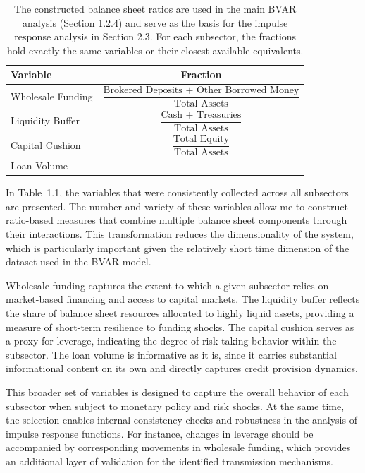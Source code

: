 \documentclass[12pt,a4paper]{report}
\begin{document}
\begin{table}[H]
\centering
\renewcommand{\arraystretch}{2.0}   %
\begin{tabular}{l|c}
\hline
\textbf{Variable} & \textbf{Fraction} \\
\hline
Wholesale Funding & $\dfrac{\text{Brokered Deposits + Other Borrowed Money}}{\text{Total Assets}}$ \\
Liquidity Buffer  & $\dfrac{\text{Cash + Treasuries}}{\text{Total Assets}}$ \\
Capital Cushion   & $\dfrac{\text{Total Equity}}{\text{Total Assets}}$ \\
Loan Volume       & -- \\
\hline
\end{tabular}
\caption{The constructed balance sheet ratios are used in the main BVAR analysis (Section 1.2.4) and serve as the basis for the impulse response analysis in Section 2.3. For each subsector, the fractions hold exactly the same variables or their closest available equivalents.}
\label{tab:balance_sheet_ratios}
\end{table}

In Table~1.1, the variables that were consistently collected across all subsectors are presented.
The number and variety of these variables allow me to construct ratio-based measures that combine
multiple balance sheet components through their interactions. This transformation reduces the
dimensionality of the system, which is particularly important given the relatively short time
dimension of the dataset used in the BVAR model.

Wholesale funding captures the extent to which a given subsector relies on market-based financing
and access to capital markets. The liquidity buffer reflects the share of balance sheet resources
allocated to highly liquid assets, providing a measure of short-term resilience to funding shocks.
The capital cushion serves as a proxy for leverage, indicating the degree of risk-taking behavior
within the subsector. The loan volume is informative as it is, since it carries substantial informational content on its own and directly captures credit provision dynamics. 

This broader set of variables is designed to capture the overall behavior of each subsector when
subject to monetary policy and risk shocks. At the same time, the selection enables internal
consistency checks and robustness in the analysis of impulse response functions. For instance,
changes in leverage should be accompanied by corresponding movements in wholesale funding, which
provides an additional layer of validation for the identified transmission mechanisms.
\end{document}
